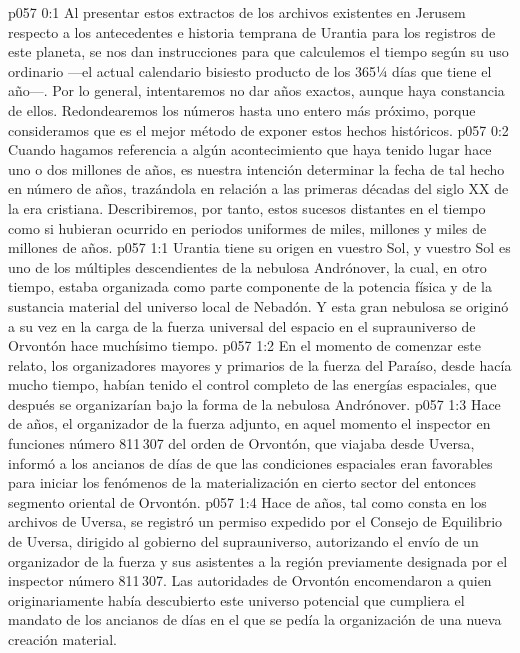 \author{Portador de vida}
\vs p057 0:1 Al presentar estos extractos de los archivos existentes en Jerusem respecto a los antecedentes e historia temprana de Urantia para los registros de este planeta, se nos dan instrucciones para que calculemos el tiempo según su uso ordinario ---el actual calendario bisiesto producto de los 365¼ días que tiene el año---. Por lo general, intentaremos no dar años exactos, aunque haya constancia de ellos. Redondearemos los números hasta uno entero más próximo, porque consideramos que es el mejor método de exponer estos hechos históricos.
\vs p057 0:2 Cuando hagamos referencia a algún acontecimiento que haya tenido lugar hace uno o dos millones de años, es nuestra intención determinar la fecha de tal hecho en número de años, trazándola en relación a las primeras décadas del siglo XX de la era cristiana. Describiremos, por tanto, estos sucesos distantes en el tiempo como si hubieran ocurrido en periodos uniformes de miles, millones y miles de millones de años.
\vs p057 1:1 Urantia tiene su origen en vuestro Sol, y vuestro Sol es uno de los múltiples descendientes de la nebulosa Andrónover, la cual, en otro tiempo, estaba organizada como parte componente de la potencia física y de la sustancia material del universo local de Nebadón. Y esta gran nebulosa se originó a su vez en la carga de la fuerza universal del espacio en el suprauniverso de Orvontón hace muchísimo tiempo.
\vs p057 1:2 En el momento de comenzar este relato, los organizadores mayores y primarios de la fuerza del Paraíso, desde hacía mucho tiempo, habían tenido el control completo de las energías espaciales, que después se organizarían bajo la forma de la nebulosa Andrónover.
\vs p057 1:3 \pc Hace  de años, el organizador de la fuerza adjunto, en aquel momento el inspector en funciones número 811\,307 del orden de Orvontón, que viajaba desde Uversa, informó a los ancianos de días de que las condiciones espaciales eran favorables para iniciar los fenómenos de la materialización en cierto sector del entonces segmento oriental de Orvontón.
\vs p057 1:4 \pc Hace  de años, tal como consta en los archivos de Uversa, se registró un permiso expedido por el Consejo de Equilibrio de Uversa, dirigido al gobierno del suprauniverso, autorizando el envío de un organizador de la fuerza y sus asistentes a la región previamente designada por el inspector número 811\,307. Las autoridades de Orvontón encomendaron a quien originariamente había descubierto este universo potencial que cumpliera el mandato de los ancianos de días en el que se pedía la organización de una nueva creación material.
